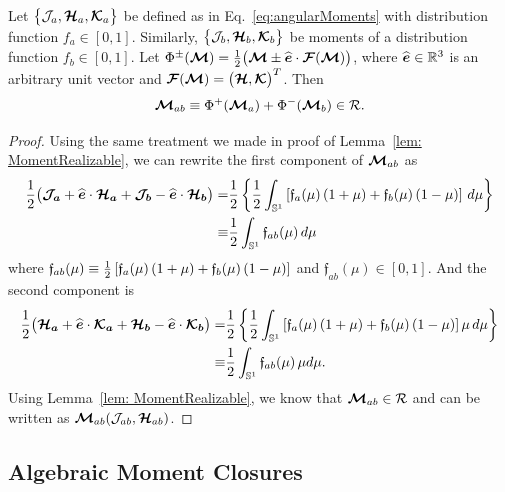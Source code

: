 \begin{lemma}
  Let $\big\{\mathcal{J}_{a},\boldsymbol{\mathcal{H}}_{a},\boldsymbol{\mathcal{K}}_{a}\big\}$ be defined as in Eq.~\eqref{eq:angularMoments} with distribution function $f_{a}\in[0,1]$.  
  Similarly, $\big\{\mathcal{J}_{b},\boldsymbol{\mathcal{H}}_{b},\boldsymbol{\mathcal{K}}_{b}\big\}$ be moments of a distribution function $f_{b}\in[0,1]$.  
  Let $\Phi^{\pm}(\boldsymbol{\mathcal{M}})=\frac{1}{2}\big(\boldsymbol{\mathcal{M}}\pm\widehat{\boldsymbol{e}}\cdot\boldsymbol{\mathcal{F}}(\boldsymbol{\mathcal{M}})\big)$, where $\widehat{\boldsymbol{e}}\in\mathbb{R}^{3}$ is an arbitrary unit vector and $\boldsymbol{\mathcal{F}}(\boldsymbol{\mathcal{M}})=\big(\boldsymbol{\mathcal{H}},\boldsymbol{\mathcal{K}}\big)^{T}$.  
  Then
  \begin{equation}
    \boldsymbol{\mathcal{M}}_{ab} \equiv \Phi^{+}(\boldsymbol{\mathcal{M}}_{a})+\Phi^{-}(\boldsymbol{\mathcal{M}}_{b})\in\mathcal{R}.
  \end{equation}
\end{lemma}
\begin{proof}
  Using the same treatment we made in proof of Lemma~\ref{lem: MomentRealizable}, we can rewrite the first component of $\boldsymbol{\mathcal{M}}_{ab}$ as
  \begin{align*}
  \frac{1}{2}\big(\boldsymbol{\mathcal{J}_{a}} + \widehat{\boldsymbol{e}}\cdot\boldsymbol{\mathcal{H}_{a}}+\boldsymbol{\mathcal{J}_{b}} - \widehat{\boldsymbol{e}}\cdot\boldsymbol{\mathcal{H}_{b}}\big) = &\frac{1}{2} \left\lbrace \frac{1}{2}\int_{\mathbb{S}^{1}}\left[ \mathfrak{f}_{a}(\mu)\,(1+\mu) + \mathfrak{f}_{b}(\mu)\,(1-\mu)\right] \,d\mu \right\rbrace \\
  \equiv  &\frac{1}{2}\int_{\mathbb{S}^{1}} \mathfrak{f}_{ab}(\mu)\,d\mu
  \end{align*}
  where $\mathfrak{f}_{ab}(\mu) \equiv \frac{1}{2}\left[ \mathfrak{f}_{a}(\mu)\,(1+\mu) + \mathfrak{f}_{b}(\mu)\,(1-\mu)\right]$ and $\mathfrak{f}_{ab}(\mu)\in[0,1]$.
  And the second component is
  \begin{align*} 
   \frac{1}{2}\big(\boldsymbol{\mathcal{H}_{a}} + \widehat{\boldsymbol{e}}\cdot\boldsymbol{\mathcal{K}_{a}}+\boldsymbol{\mathcal{H}_{b}} - \widehat{\boldsymbol{e}}\cdot\boldsymbol{\mathcal{K}_{b}}\big) =
   &\frac{1}{2} \left\lbrace \frac{1}{2}\int_{\mathbb{S}^{1}}\left[ \mathfrak{f}_{a}(\mu)\,(1+\mu) + \mathfrak{f}_{b}(\mu)\,(1-\mu)\right]\mu \,d\mu \right\rbrace \\
   \equiv  &\frac{1}{2}\int_{\mathbb{S}^{1}} \mathfrak{f}_{ab}(\mu)\,\mu d\mu. 
  \end{align*}
  Using Lemma~\ref{lem: MomentRealizable}, we know that $\boldsymbol{\mathcal{M}}_{ab}\in\mathcal{R}$ and can be written as $\boldsymbol{\mathcal{M}}_{ab}(\mathcal{J}_{ab},\boldsymbol{\mathcal{H}}_{ab})$.
\end{proof}

\subsection{Algebraic Moment Closures}

